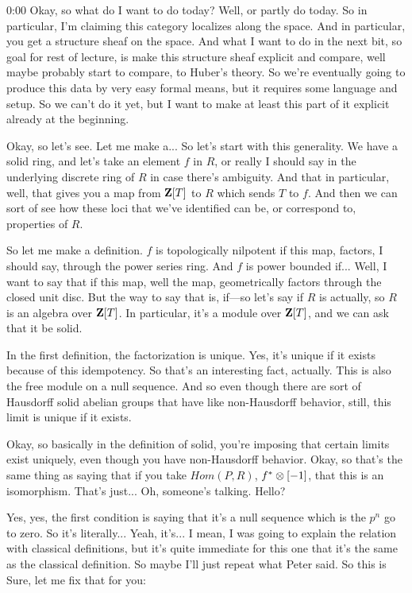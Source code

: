 \begin{unfinished}{0:00}
Okay, so what do I want to do today? Well, or partly do today. So in particular, I'm claiming this category localizes along the space. And in particular, you get a structure sheaf on the space. And what I want to do in the next bit, so goal for rest of lecture, is make this structure sheaf explicit and compare, well maybe probably start to compare, to Huber's theory. So we're eventually going to produce this data by very easy formal means, but it requires some language and setup. So we can't do it yet, but I want to make at least this part of it explicit already at the beginning.

Okay, so let's see. Let me make a... So let's start with this generality. We have a solid ring, and let's take an element $f$ in $R$, or really I should say in the underlying discrete ring of $R$ in case there's ambiguity. And that in particular, well, that gives you a map from $\mathbf Z[T]$ to $R$ which sends $T$ to $f$. And then we can sort of see how these loci that we've identified can be, or correspond to, properties of $R$.

So let me make a definition. $f$ is topologically nilpotent if this map, factors, I should say, through the power series ring. And $f$ is power bounded if... Well, I want to say that if this map, well the map, geometrically factors through the closed unit disc. But the way to say that is, if---so let's say if $R$ is actually, so $R$ is an algebra over $\mathbf Z[T]$. In particular, it's a module over $\mathbf Z[T]$, and we can ask that it be solid.

In the first definition, the factorization is unique. Yes, it's unique if it exists because of this idempotency. So that's an interesting fact, actually. This is also the free module on a null sequence. And so even though there are sort of Hausdorff solid abelian groups that have like non-Hausdorff behavior, still, this limit is unique if it exists.

Okay, so basically in the definition of solid, you're imposing that certain limits exist uniquely, even though you have non-Hausdorff behavior. Okay, so that's the same thing as saying that if you take $Hom(P, R)$, $f^* \otimes [-1]$, that this is an isomorphism. That's just... Oh, someone's talking. Hello?

Yes, yes, the first condition is saying that it's a null sequence which is the $p^n$ go to zero. So it's literally... Yeah, it's... I mean, I was going to explain the relation with classical definitions, but it's quite immediate for this one that it's the same as the classical definition. So maybe I'll just repeat what Peter said. So this is
Sure, let me fix that for you:


\end{unfinished}
